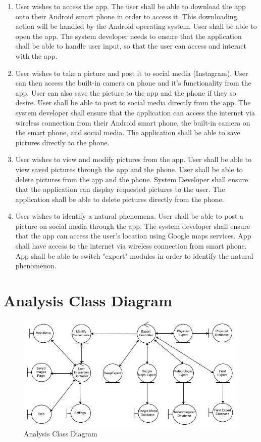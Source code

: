 \documentclass[]{article}
\begin{document}
\begin{enumerate}
	\item User wishes to access the app.  The user shall be able to download the app onto their Android smart phone in order to access it.  This downloading action will be handled by the Android operating system.  User shall be able to open the app.  The system developer needs to ensure that the application shall be able to handle user input, so that the user can access and interact with the app.
	\item User wishes to take a picture and post it to social media (Instagram).  User can then access the built-in camera on phone and it's functionality from the app.  User can also save the picture to the app and the phone if they so desire.  User shall be able to post to social media directly from the app.  The system developer shall ensure that the application can access the internet via wireless connection from their Android smart phone, the built-in camera on the smart phone, and social media.  The application shall be able to save pictures directly to the phone.
	\item User wishes to view and modify pictures from the app.  User shall be able to view saved pictures through the app and the phone.  User shall be able to delete pictures from the app and the phone.  System Developer shall ensure that the application can display requested pictures to the user.  The application shall be able to delete pictures directly from the phone.
	\item User wishes to identify a natural phenomena. User shall be able to post a picture on social media through the app.  The system developer shall ensure that the app can access the user's location using Google maps services. App shall have access to the internet via wireless connection from smart phone. App shall be able to switch "expert" modules in order to identify the natural phenomenon. 
\end{enumerate}

\section{Analysis Class Diagram}
\begin{figure}
	\includegraphics[width=\linewidth]{AnalysisClassDiagram.png}
	\caption{Analysis Class Diagram}
\end{figure}
\end{document}
